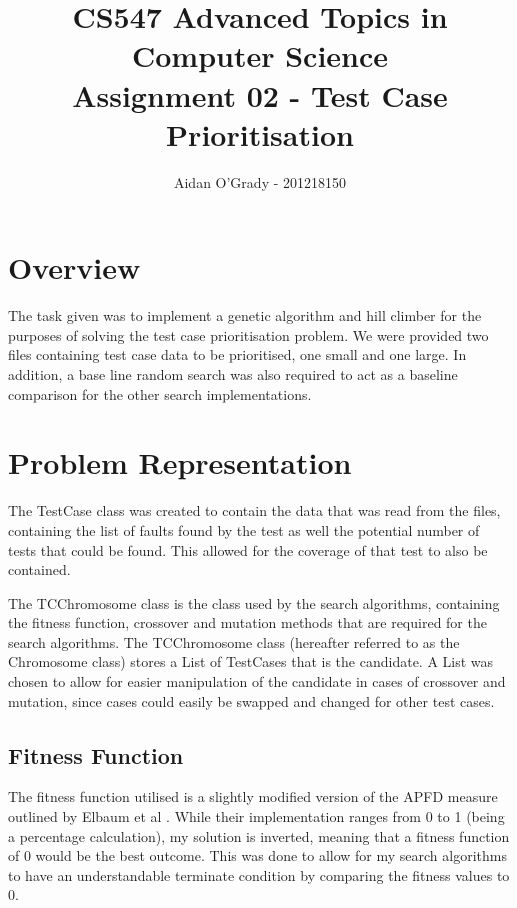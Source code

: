 \documentclass[11pt, a4paper]{article}
\begin{document}
\title{CS547 Advanced Topics in Computer Science\\
\large{Assignment 02 - Test Case Prioritisation}}
\author{Aidan O'Grady - 201218150}
\date{}
\maketitle

\section{Overview}
The task given was to implement a genetic algorithm and hill climber for the
purposes of solving the test case prioritisation problem. We were provided two
files containing test case data to be prioritised, one small and one large. In
addition, a base line random search was also required to act as a baseline
comparison for the other search implementations.

\section{Problem Representation}
The TestCase class was created to contain the data that was read from the files,
containing the list of faults found by the test as well the potential number of
tests that could be found. This allowed for the coverage of that test to also
be contained.

The TCChromosome class is the class used by the search algorithms, containing
the fitness function, crossover and mutation methods that are required for
the search algorithms. The TCChromosome class (hereafter referred to as the
Chromosome class) stores a List of TestCases that is the candidate. A List was
chosen to allow for easier manipulation of the candidate in cases of crossover
and mutation, since cases could easily be swapped and changed for other test
cases.

\subsection{Fitness Function}
The fitness function utilised is a slightly modified version of the APFD measure
outlined by Elbaum et al \cite[Section~4.1]{Elbaum:2002:TCP:506201.506205}.
While their implementation ranges from 0 to 1 (being a percentage calculation),
my solution is inverted, meaning that a fitness function of 0 would be the best
outcome. This was done to allow for my search algorithms to have an
understandable terminate condition by comparing the fitness values to 0. 
\end{document}
